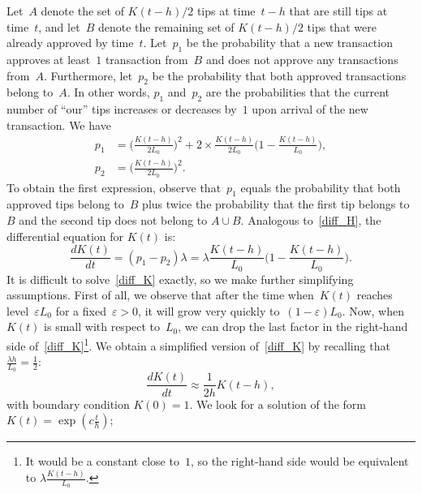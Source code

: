 \documentclass[12pt]{article}
\newcommand{\eps}{\varepsilon}
\begin{document}
\begin{CJK}{UTF8}{bkai}
Let~$A$ denote
the set of  
$K(t-h)/2$ tips at time~$t-h$
that are still tips at time~$t$, and let~$B$ denote the remaining 
set of $K(t-h)/2$ tips that were already approved by time~$t$.
Let~$p_1$ be the probability that a new transaction
approves at least~$1$ transaction from~$B$
and does not approve any transactions from~$A$. Furthermore,
let~$p_2$ be the probability that both approved transactions
belong to~$A$. In other words, $p_1$ and~$p_2$ are
the probabilities that the current number of ``our'' tips
increases or decreases by~$1$ upon arrival of the new transaction. 
We have
\begin{align*}
 p_1 &= \Big(\frac{K(t-h)}{2 L_0}\Big)^2 + 2\times
\frac{K(t-h)}{2 L_0}\Big(1-\frac{K(t-h)}{L_0}\Big),  \\
 p_2 &= \Big(\frac{K(t-h)}{2 L_0}\Big)^2.
\end{align*}
To obtain the first expression, observe that~$p_1$
equals the probability that both approved tips 
belong to~$B$ plus twice the probability that the first
tip belongs to~$B$ and the second tip does not 
belong to $A\cup B$.
Analogous to~\eqref{diff_H},
the differential equation for $K(t)$ is:
\begin{equation}
\label{diff_K}
 \frac{d K(t)}{dt} = (p_1-p_2)\lambda = \lambda
 \frac{K(t-h)}{ L_0}\Big(1-\frac{K(t-h)}{L_0}\Big).
\end{equation}
It is difficult to solve~\eqref{diff_K} exactly,
so we make further simplifying assumptions.
First of all, we observe that after the time when~$K(t)$
reaches level~$\eps L_0$ for a fixed~$\eps>0$, it will grow 
very quickly to~$(1-\eps)L_0$. 
Now, when~$K(t)$ is small with respect to~$L_0$, 
we can drop the last factor in the right-hand side of~\eqref{diff_K}\footnote{It 
would be a constant close to~$1$, so the 
right-hand side would be equivalent to 
$\lambda\frac{K(t-h)}{ L_0}$.}.
We obtain a simplified version of~\eqref{diff_K}
by recalling that $\frac{\lambda h}{L_0}=\frac{1}{2}$:
\begin{equation}
\label{diff_K_simpl}
 \frac{d K(t)}{dt} \approx \frac{1}{2h}K(t-h),
\end{equation}
with boundary condition $K(0)=1$. 
We look for a solution of the form $K(t)=\exp(c\frac{t}{h})$;

\end{CJK}
\end{document}
